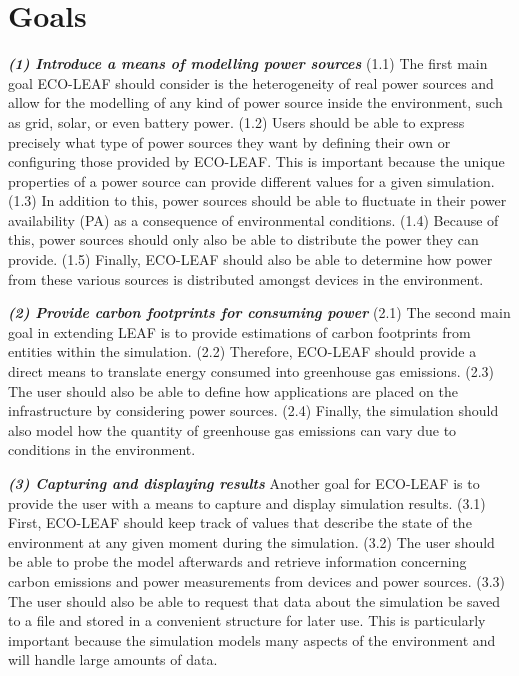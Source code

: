 \documentclass{l4proj}
\begin{document}
\section{Goals}\label{intro:subsec:goals}
\textbf{\textit{(1) Introduce a means of modelling power sources}}
(1.1)\label{goal1.1} The first main goal ECO-LEAF should consider is the heterogeneity of real power sources and allow for the modelling of any kind of power source inside the environment, such as grid, solar, or even battery power.
(1.2)\label{goal1.2} Users should be able to express precisely what type of power sources they want by defining their own or configuring those provided by ECO-LEAF.
This is important because the unique properties of a power source can provide different values for a given simulation.
(1.3)\label{goal1.3} In addition to this, power sources should be able to fluctuate in their power availability (PA) as a consequence of environmental conditions.
(1.4)\label{goal1.4} Because of this, power sources should only also be able to distribute the power they can provide.
(1.5)\label{goal1.5} Finally, ECO-LEAF should also be able to determine how power from these various sources is distributed amongst devices in the environment.

\textbf{\textit{(2) Provide carbon footprints for consuming power}}
(2.1)\label{goal2.1} The second main goal in extending LEAF is to provide estimations of carbon footprints from entities within the simulation.
(2.2)\label{goal2.2} Therefore, ECO-LEAF should provide a direct means to translate energy consumed into greenhouse gas emissions.
(2.3)\label{goal2.3} The user should also be able to define how applications are placed on the infrastructure by considering power sources.
(2.4)\label{goal2.4} Finally, the simulation should also model how the quantity of greenhouse gas emissions can vary due to conditions in the environment.

\textbf{\textit{(3) Capturing and displaying results}}
Another goal for ECO-LEAF is to provide the user with a means to capture and display simulation results.
(3.1)\label{goal3.1} First, ECO-LEAF should keep track of values that describe the state of the environment at any given moment during the simulation.
(3.2)\label{goal3.2} The user should be able to probe the model afterwards and retrieve information concerning carbon emissions and power measurements from devices and power sources.
(3.3)\label{goal3.3} The user should also be able to request that data about the simulation be saved to a file and stored in a convenient structure for later use.
This is particularly important because the simulation models many aspects of the environment and will handle large amounts of data.
\end{document}
